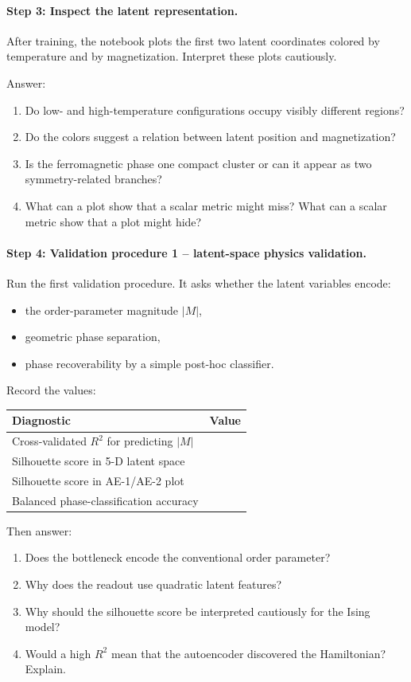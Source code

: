 \paragraph{Step 3: Inspect the latent representation.}
After training, the notebook plots the first two latent coordinates colored by temperature and by magnetization. Interpret these plots cautiously.

Answer:
\begin{enumerate}
    \item Do low- and high-temperature configurations occupy visibly different regions?
    \item Do the colors suggest a relation between latent position and magnetization?
    \item Is the ferromagnetic phase one compact cluster or can it appear as two symmetry-related branches?
    \item What can a plot show that a scalar metric might miss? What can a scalar metric show that a plot might hide?
\end{enumerate}

\paragraph{Step 4: Validation procedure 1 -- latent-space physics validation.}
Run the first validation procedure. It asks whether the latent variables encode:
\begin{itemize}
    \item the order-parameter magnitude \(|M|\),
    \item geometric phase separation,
    \item phase recoverability by a simple post-hoc classifier.
\end{itemize}

Record the values:
\begin{center}
\begin{tabular}{l l}
\hline
Diagnostic & Value \\
\hline
Cross-validated \(R^2\) for predicting \(|M|\) & \\
Silhouette score in 5-D latent space & \\
Silhouette score in AE-1/AE-2 plot & \\
Balanced phase-classification accuracy & \\
\hline
\end{tabular}
\end{center}

Then answer:
\begin{enumerate}
    \item Does the bottleneck encode the conventional order parameter?
    \item Why does the readout use quadratic latent features?
    \item Why should the silhouette score be interpreted cautiously for the Ising model?
    \item Would a high \(R^2\) mean that the autoencoder discovered the Hamiltonian? Explain.
\end{enumerate}

